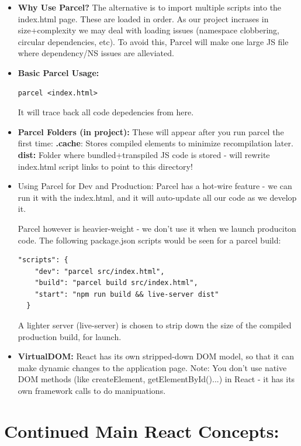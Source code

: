 \documentclass[8pt,a4paper]{extarticle}
\begin{document}
\begin{itemize}
\item \textbf{Why Use Parcel?} The alternative is to import multiple scripts into the index.html page. These are loaded in order. As our project incrases in size+complexity we may deal with loading issues (namespace clobbering, circular dependencies, etc). To avoid this, Parcel will make one large JS file where dependency/NS issues are alleviated.

\item \textbf{Basic Parcel Usage:}

\begin{verbatim}
parcel <index.html>
\end{verbatim}

It will trace back all code depedencies from here.
 
\item \textbf{Parcel Folders (in project):} These will appear after you run parcel the first time:
\mitem \textbf{.cache}: Stores compiled elements to minimize recompilation later.
\mitem \textbf{dist:} Folder where bundled+transpiled JS code is stored - will rewrite index.html script links to point to this directory!
\item Using Parcel for Dev and Production: Parcel has a hot-wire feature - we can run it with the index.html, and it will auto-update all our code as we develop it.

Parcel however is heavier-weight - we don't use it when we launch produciton code. The following package.json scripts would be seen for a parcel build:

\begin{verbatim}
"scripts": {
    "dev": "parcel src/index.html",
    "build": "parcel build src/index.html",
    "start": "npm run build && live-server dist"
  }
\end{verbatim}

A lighter server (live-server) is chosen to strip down the size of the compiled production build, for launch.

\item \textbf{VirtualDOM:} React has its own stripped-down DOM model, so that it can make dynamic changes to the application page. Note: You don't use native DOM methods (like createElement, getElementById()...) in React - it has its own framework calls to do manipuations.
\end{itemize}

\section*{Continued Main React Concepts:}
\end{document}
